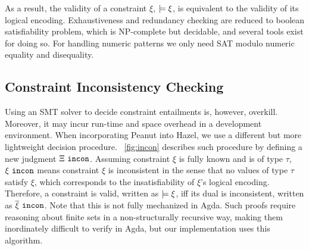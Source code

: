 As a result, the validity of a constraint $\xi$, $\models \xi$, is equivalent to the validity of its logical encoding. Exhaustiveness and redundancy checking are reduced to boolean satisfiability problem, which is NP-complete but decidable, and several tools exist for doing so. For handling numeric patterns we only need SAT modulo numeric equality and disequality.

\subsection{Constraint Inconsistency Checking}

Using an SMT solver to decide constraint entailments is, however, overkill. Moreover, it may incur run-time and space overhead in a  development environment. When incorporating Peanut into Hazel, we use a different but more lightweight decision procedure. \figurename~\ref{fig:incon} describes such procedure by defining a new judgment $\Xi ~\mathtt{incon}$. Assuming constraint $\xi$ is fully known and is of type $\tau$, $\xi ~\mathtt{incon}$ means constraint $\xi$ is inconsistent in the sense that no values of type $\tau$ satisfy $\xi$, which corresponds to the insatisfiability of $\xi$'s logical encoding. Therefore, a constraint is valid, written as $\models \xi$, iff its dual is inconsistent, written as $\overline{\xi} ~\mathtt{incon}$. Note that this is not fully mechanized in Agda. Such proofs require reasoning about finite sets in a non-structurally recursive way, making them inordinately difficult to verify in Agda, but our implementation uses this algorithm.




%
